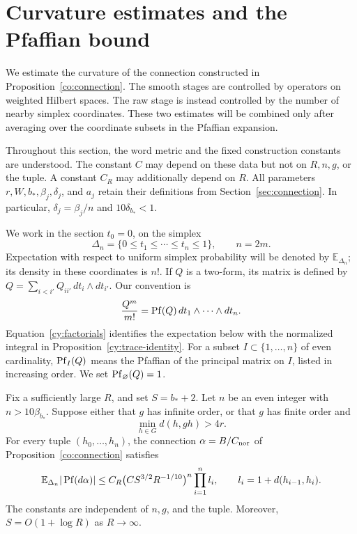 \section{Curvature estimates and the Pfaffian bound}
\label{sec:curvature}

We estimate the curvature of the connection constructed in
Proposition~\ref{co:connection}.  The smooth stages are controlled by
operators on weighted Hilbert spaces.  The raw stage is instead controlled
by the number of nearby simplex coordinates.  These two estimates will be
combined only after averaging over the coordinate subsets in the
Pfaffian expansion.

Throughout this section, the word metric and the fixed construction
constants are understood.  The constant $C$ may depend on these data but
not on $R,n,g$, or the tuple.  A constant $C_R$ may additionally depend
on $R$.  All parameters $r,W,b_*,\beta_j,\delta_j$, and $a_j$ retain
their definitions from Section~\ref{sec:connection}.  In particular,
$\delta_j=\beta_j/n$ and $10\delta_{b_*}<1$.

We work in the section $t_0=0$, on the simplex
\[
 \Delta_n=\{0\le t_1\le\cdots\le t_n\le1\},
 \qquad n=2m.
\]
Expectation with respect to uniform simplex probability will be denoted
by $\mathbb E_{\Delta_n}$; its density in these coordinates is $n!$.
If $Q$ is a two-form, its matrix is defined by
$Q=\sum_{i<i'}Q_{ii'}\,dt_i\wedge dt_{i'}$.  Our convention is
\begin{equation}
 \frac{Q^m}{m!}
 =\operatorname{Pf}(Q)\,dt_1\wedge\cdots\wedge dt_n.
 \label{pf:normalization}
\end{equation}
Equation~\eqref{cy:factorials} identifies the expectation below with
the normalized integral in Proposition~\ref{cy:trace-identity}.  For a subset
$I\subset\{1,\ldots,n\}$ of even cardinality, $\operatorname{Pf}_I(Q)$ means the
Pfaffian of the principal matrix on $I$, listed in increasing order.
We set $\operatorname{Pf}_{\varnothing}(Q)=1$.

\begin{theorem}
\label{pf:bound}
Fix a sufficiently large $R$, and set $S=b_*+2$.  Let $n$ be an even
integer with $n>10\beta_{b_*}$.  Suppose either that $g$ has infinite
order, or that $g$ has finite order and
\[
 \min_{h\in G}d(h,gh)>4r.
\]
For every tuple $(h_0,\ldots,h_n)$, the connection $\alpha=B/C_{\rm nor}$
of Proposition~\ref{co:connection} satisfies
\begin{equation}
 \mathbb E_{\Delta_n}|\operatorname{Pf}(d\alpha)|
 \le C_R\bigl(CS^{3/2}R^{-1/10}\bigr)^n
          \prod_{i=1}^n l_i,
 \qquad l_i=1+d(h_{i-1},h_i).
 \label{pf:main-estimate}
\end{equation}
The constants are independent of $n,g$, and the tuple.  Moreover,
$S=O(1+\log R)$ as $R\to\infty$.
\end{theorem}

